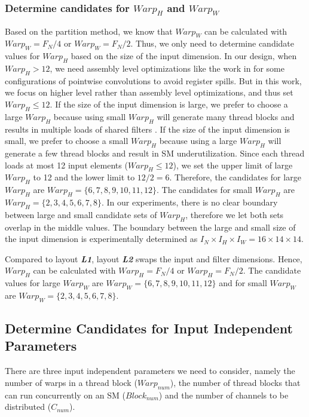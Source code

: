 \subsubsection{Determine candidates for $Warp_H$ and $Warp_W$}
Based on the partition method, we know that $Warp_W$ can be calculated with $Warp_W=F_N/4$ or $Warp_W=F_N/2$. Thus, we only need to determine candidate values for $Warp_H$ based on the size of the input dimension.
In our design, when $Warp_H > 12$, we need assembly level optimizations like the work in
\cite{yan2020optimizing,yan2020demystifying} for some configurations of pointwise convolutions to avoid register spills. But in this work,
we focus on higher level rather than assembly level optimizations, and thus set $Warp_H \leq 12$.
If the size of the input dimension is large, we prefer to choose a large $Warp_H$ because using small $Warp_H$ will generate many thread blocks and results in multiple loads of shared filters \cite{jia2020enabling, zheng2020flextensor}.
If the size of the input dimension is small, we prefer to choose a small $Warp_H$ because using a large $Warp_H$ will generate a few thread blocks and result in SM underutilization.
Since each thread loads at most 12 input elements ($Warp_H \leq 12$), we set the upper limit of large $Warp_H$ to 12 and the lower limit to $12/2=6$.
Therefore, the candidates for large $Warp_H$ are $Warp_H=\{6,7,8,9,10,11,12\}$.
The candidates for small $Warp_H$ are $Warp_H=\{2,3,4,5,6,7,8\}$.
In our experiments, there is no clear boundary between large and small candidate sets of $Warp_H$, therefore we let both sets overlap in the middle values.
The boundary between the large and small size of the input dimension is experimentally determined as $I_N \times I_H \times I_W=16 \times 14 \times 14$.

Compared to layout \textbf{\emph{L1}}, layout \textbf{\emph{L2}} swaps the input and filter dimensions. Hence, $Warp_H$ can be calculated with $Warp_H=F_N/4$ or $Warp_H=F_N/2$. The candidate values for large $Warp_W$ are $Warp_W=\{6,7,8,9,10,11,12\}$ and for small $Warp_W$ are $Warp_W=\{2,3,4,5,6,7,8\}$.

\subsection{Determine Candidates for Input Independent Parameters\label{sec:pwinputindependent}}

There are three input independent parameters we need to consider, namely the number of warps in a thread block ($Warp_{num}$), the number of thread blocks that can run concurrently on an SM ($Block_{num}$) and the number of channels to be distributed ($C_{num}$).
